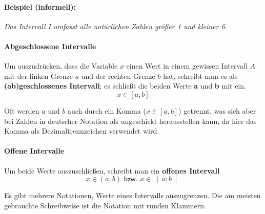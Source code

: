 \paragraph{Beispiel (informell):} \textit{Das Intervall I umfasst alle natürlichen Zahlen größer 1 und kleiner 6.}

\paragraph{Abgeschlossene Intervalle}
\begin{flushleft}
Um auszudrücken, dass die Variable $x$ einen Wert in einem gewissen Intervall $A$ mit der linken Grenze $a$ und der rechten Grenze $b$ hat, schreibt man es als \textbf{(ab)geschlossenes Intervall}; es schließt die beiden Werte \textbf{a} und \textbf{b} mit ein. 
\begin{equation*}
x \in \left[a;b \right]
\end{equation*}
\begin{warning}
	Oft werden $a$ und $b$ auch durch ein Komma ($x \in \left[a,b \right]$) getrennt, was sich aber bei Zahlen in deutscher Notation als ungeschickt herausstellen kann, da hier das Komma als Dezimaltrennzeichen verwendet wird.
\end{warning}
\end{flushleft}

\paragraph{Offene Intervalle}
\begin{flushleft}
Um beide Werte auszuschließen, schreibt man ein \textbf{offenes Intervall}
\begin{equation*}
x \in (a;b) \textsf{ bzw. } x \in \left]a;b \right[
\end{equation*}
\end{flushleft}

\begin{warning}
	Es gibt mehrere Notationen, Werte eines Intervalls auszugrenzen. Die am meisten gebrauchte Schreibweise ist die Notation mit runden Klammern.
\end{warning}

